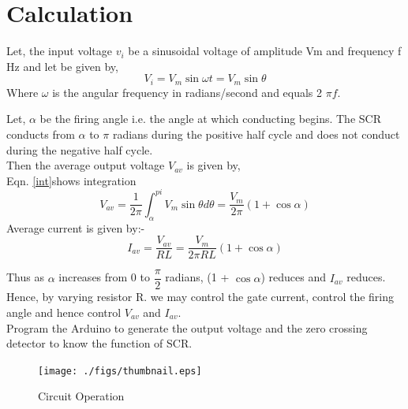 \documentclass[journal,12pt,twocolumn]{IEEEtran}
\begin{document}
\section{Calculation}
 Let, the input voltage $v_i$ be a sinusoidal voltage of amplitude Vm and frequency f Hz and let be given by,\\
 \begin{equation}
 V_i=V_m \sin{\omega t}= V_m \sin{\theta}
 \end{equation}
Where $\omega$ is the angular frequency in radians/second and equals 2 $\pi f$.

Let, $\alpha$ be the firing angle i.e. the angle at which conducting begins. The SCR conducts from $\alpha$ to $\pi$ radians during the positive half cycle and does not conduct during the negative half cycle.\\

Then the average output voltage $V_{av}$ is given by,\\

Eqn. \ref{int}shows integration
\begin{equation}
V_{av}=\frac{1}{2\pi}\int_{\alpha}^{pi}V_{m}\sin{\theta}d\theta
\label{int}
=\frac{V_m}{2\pi} (1+\cos{\alpha})
\end{equation}
Average current is given by:-
\begin{equation}
I_{av}=\frac{V_{av}}{RL}=\frac{V_{m}}{2{\pi}RL}(1+\cos{\alpha})
\end{equation}

Thus as $\alpha$ increases from 0 to $\dfrac{\pi}{2}$ radians, (1 + $\cos \alpha$) reduces and $I_{av}$ reduces. Hence, by varying resistor R. we may control the gate current, control the firing angle and hence control $V_{av}$ and $I_{av}$.\\


\problem
Program the Arduino to generate the output voltage and the zero crossing detector to know the function of SCR.


\begin{figure}[t!]
\centering
\texttt{[image: ./figs/thumbnail.eps]}

\caption{Circuit Operation  } 
\label{fig3}
\end{figure}
\end{document}
